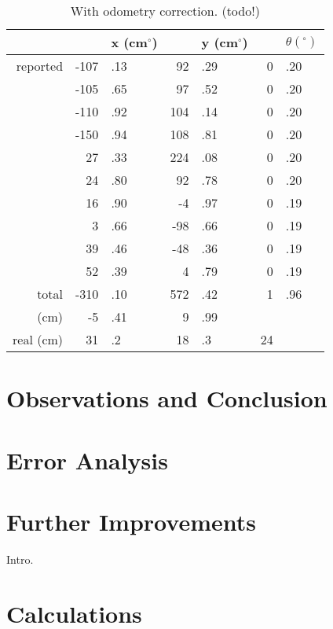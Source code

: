 \documentclass[twocolumn]{article}
\def\degree{\ensuremath{^\circ}}
\begin{document}
\begin{table}[htb]
\begin{center}\begin{tabular}{r r@{}l r@{}l r@{}l}
& &x (cm\degree)& &y (cm\degree)& &$\theta (\degree)$ \\
\hline
reported&-107&.13&	92&.29&	0&.20 \\
&-105&.65&	97&.52&	0&.20 \\
&-110&.92&	104&.14&	0&.20 \\
&-150&.94&	108&.81&	0&.20 \\
&27&.33&	224&.08&	0&.20 \\
&24&.80&	92&.78&	0&.20 \\
&16&.90&	-4&.97&	0&.19 \\
&3&.66&	-98&.66&	0&.19 \\
&39&.46&	-48&.36&	0&.19 \\
&52&.39&	4&.79&	0&.19 \\
\hline
total&	-310&.10&	572&.42&	1&.96 \\
(cm)&	-5&.41& 9&.99\\
real (cm)&	31&.2&	18&.3&	24
\end{tabular}\end{center}
\caption{With odometry correction. (todo!)}
\label{b}
\end{table}

\section{Observations and Conclusion}
\section{Error Analysis}
\section{Further Improvements}

Intro.\cite{lab2}

\section{Calculations}
\end{document}
